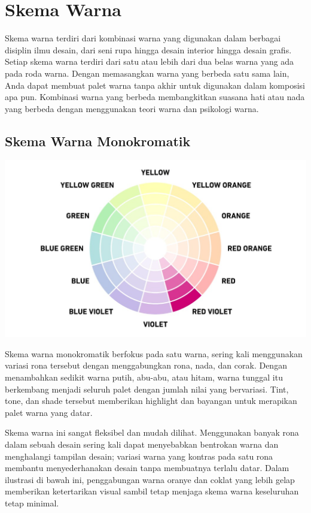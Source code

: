 \documentclass[a4paper]{article}
\begin{document}
\newpage

\section{Skema Warna}
Skema warna terdiri dari kombinasi warna yang digunakan dalam berbagai disiplin ilmu desain, dari seni rupa hingga desain interior hingga desain grafis. Setiap skema warna terdiri dari satu atau lebih dari dua belas warna yang ada pada roda warna. Dengan memasangkan warna yang berbeda satu sama lain, Anda dapat membuat palet warna tanpa akhir untuk digunakan dalam komposisi apa pun. Kombinasi warna yang berbeda membangkitkan suasana hati atau nada yang berbeda dengan menggunakan teori warna dan psikologi warna.

\subsection{Skema Warna Monokromatik}
\begin{center}
  \includegraphics[width=\textwidth]{resources/monochromatic.jpg}
\end{center}
Skema warna monokromatik berfokus pada satu warna, sering kali menggunakan variasi rona tersebut dengan menggabungkan rona, nada, dan corak. Dengan menambahkan sedikit warna putih, abu-abu, atau hitam, warna tunggal itu berkembang menjadi seluruh palet dengan jumlah nilai yang bervariasi. Tint, tone, dan shade tersebut memberikan highlight dan bayangan untuk merapikan palet warna yang datar.

Skema warna ini sangat fleksibel dan mudah dilihat. Menggunakan banyak rona dalam sebuah desain sering kali dapat menyebabkan bentrokan warna dan menghalangi tampilan desain; variasi warna yang kontras pada satu rona membantu menyederhanakan desain tanpa membuatnya terlalu datar. Dalam ilustrasi di bawah ini, penggabungan warna oranye dan coklat yang lebih gelap memberikan ketertarikan visual sambil tetap menjaga skema warna keseluruhan tetap minimal.
\end{document}
